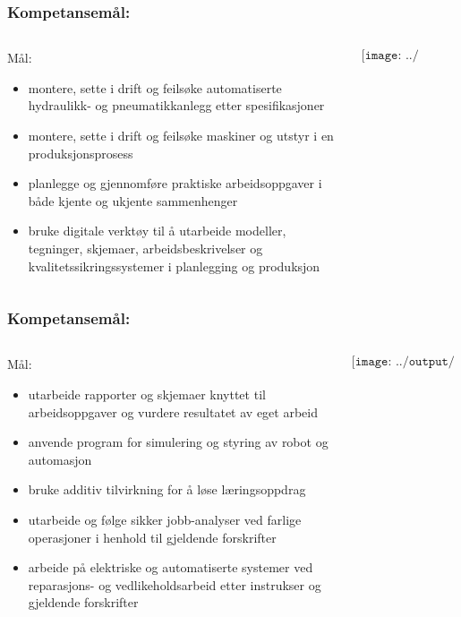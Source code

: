 \documentclass[aspectratio=169,xcolor=dvipsnames]{beamer}
\begin{document}
\begin{frame}
	\frametitle{Kompetansemål:}

	\begin{columns}
		\begin{column}{0.5\textwidth}
			Mål:
			\begin{itemize}
				
				\item montere, sette i drift og feilsøke automatiserte hydraulikk- og pneumatikkanlegg etter spesifikasjoner 
				\item montere, sette i drift og feilsøke maskiner og utstyr i en produksjonsprosess
				\item planlegge og gjennomføre praktiske arbeidsoppgaver i både kjente og ukjente sammenhenger 
				\item bruke digitale verktøy til å utarbeide modeller, tegninger, skjemaer, arbeidsbeskrivelser og kvalitetssikringssystemer i planlegging og produksjon 

			\end{itemize}
		\end{column}

		\begin{column}{0.5\textwidth}
			$$\texttt{[image: ../output/noGPLimages/udir.pdf]}$$
		\end{column}
	\end{columns}
\end{frame}
\begin{frame}
	\frametitle{Kompetansemål:}

	\begin{columns}
		\begin{column}{0.5\textwidth}
			Mål:
			\begin{itemize}
				\item utarbeide rapporter og skjemaer knyttet til arbeidsoppgaver og vurdere resultatet av eget arbeid 
				\item anvende program for simulering og styring av robot og automasjon 
				\item bruke additiv tilvirkning for å løse læringsoppdrag 
				\item utarbeide og følge sikker jobb-analyser ved farlige operasjoner i henhold til gjeldende forskrifter 
				\item arbeide på elektriske og automatiserte systemer ved reparasjons- og vedlikeholdsarbeid etter instrukser og gjeldende forskrifter

			\end{itemize}
		\end{column}

		\begin{column}{0.5\textwidth}
			$$\texttt{[image: ../output/noGPLimages/udir.pdf]}$$
		\end{column}
	\end{columns}
\end{frame}
\end{document}
